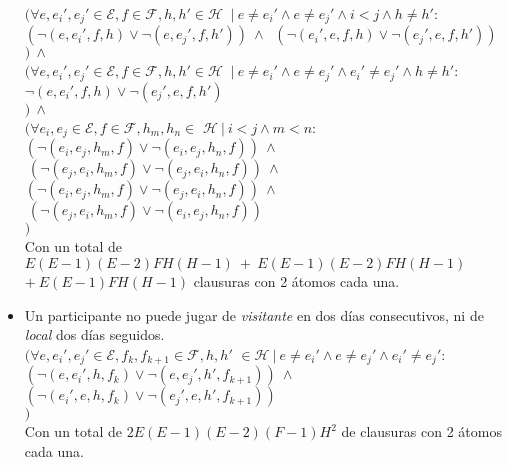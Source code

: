 \documentclass[a4paper,10pt]{article}
\newcommand{\tab}{\hspace*{0.5cm}}
\begin{document}
\begin{itemize}
      $(\forall e, e_i', e_j' \in \mathcal{E}, f \in \mathcal{F}, h, h' \in \mathcal{H}$
      $ \: | \: e \neq e_i' \wedge e \neq e_j' \wedge i < j \wedge h \neq h' : $\\
      \tab $(\neg (e, e_i', f, h) \vee \neg (e, e_j', f, h')) \: \wedge \: $
      $(\neg (e_i', e, f, h) \vee \neg (e_j', e, f, h'))$\\
      $) \: \wedge $\\
      $(\forall e, e_i', e_j' \in \mathcal{E}, f \in \mathcal{F}, h, h' \in \mathcal{H}$
      $ \: | \: e \neq e_i' \wedge e \neq e_j' \wedge e_i' \neq e_j' \wedge h \neq h' : $\\
      \tab $\neg (e, e_i', f, h) \vee \neg (e_j', e, f, h')$\\
      $) \: \wedge $\\
      $(\forall e_i, e_j \in \mathcal{E}, f \in \mathcal{F}, h_m, h_n \in $
      $\mathcal{H} \: | \: i < j \wedge m < n : $\\
      \tab $(\neg (e_i, e_j, h_m, f) \vee \neg (e_i, e_j, h_n, f)) \: \wedge $
      $\: (\neg (e_j, e_i, h_m, f) \vee \neg (e_j, e_i, h_n, f)) \: \wedge \: $\\
      \tab $(\neg (e_i, e_j, h_m, f) \vee \neg (e_j, e_i, h_n, f)) \: \wedge $
      $\: (\neg (e_j, e_i, h_m, f) \vee \neg (e_i, e_j, h_n, f))$\\
      $)$\\

      Con un total de $E(E-1)(E-2)FH(H-1) \: + \: E(E-1)(E-2)FH(H-1) \:$
      $ + \: E(E-1)FH(H-1)$ 
      clausuras con 2 \'atomos cada una.


      \item Un participante no puede jugar de \textit{visitante} en dos días 
      consecutivos, ni de \textit{local} dos días seguidos.\\

      $(\forall e, e_i', e_j' \in \mathcal{E}, f_k, f_{k+1} \in \mathcal{F}, h, h'$
      $ \in \mathcal{H} \: | \: e \neq e_i' \wedge e \neq e_j' \wedge e_i' \neq e_j':$\\
      \tab $(\neg (e, e_i', h, f_k) \vee \neg (e, e_j', h', f_{k+1})) \: \wedge \: $
      $(\neg (e_i', e, h, f_k) \vee \neg (e_j', e, h', f_{k+1}))$\\
      $)$\\

      Con un total de $2E(E-1)(E-2)(F-1)H^2$ de clausuras con 2 \'atomos cada una.\\



\end{itemize}
\end{document}
